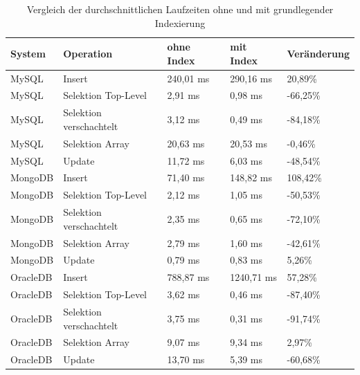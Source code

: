 \begin{table}[H]
\centering
\begin{tabular}{p{3cm}p{4cm}p{2.5cm}p{2.5cm}p{2.5cm}}
\hline
\textbf{System} & \textbf{Operation} & \textbf{ohne Index} & \textbf{mit Index} & \textbf{Veränderung} \\
\hline
MySQL & Insert & 240,01 ms & 290,16 ms & 20,89\% \\
MySQL & Selektion Top-Level & 2,91 ms & 0,98 ms & -66,25\% \\
MySQL & Selektion verschachtelt & 3,12 ms & 0,49 ms & -84,18\% \\
MySQL & Selektion Array & 20,63 ms & 20,53 ms & -0,46\% \\
MySQL & Update & 11,72 ms & 6,03 ms & -48,54\% \\
MongoDB & Insert & 71,40 ms & 148,82 ms & 108,42\% \\
MongoDB & Selektion Top-Level & 2,12 ms & 1,05 ms & -50,53\% \\
MongoDB & Selektion verschachtelt & 2,35 ms & 0,65 ms & -72,10\% \\
MongoDB & Selektion Array & 2,79 ms & 1,60 ms & -42,61\% \\
MongoDB & Update & 0,79 ms & 0,83 ms & 5,26\% \\
OracleDB & Insert & 788,87 ms & 1240,71 ms & 57,28\% \\
OracleDB & Selektion Top-Level & 3,62 ms & 0,46 ms & -87,40\% \\
OracleDB & Selektion verschachtelt & 3,75 ms & 0,31 ms & -91,74\% \\
OracleDB & Selektion Array & 9,07 ms & 9,34 ms & 2,97\% \\
OracleDB & Update & 13,70 ms & 5,39 ms & -60,68\% \\
\hline
\end{tabular}
\caption{Vergleich der durchschnittlichen Laufzeiten ohne und mit grundlegender Indexierung}
\label{tab:vergleich-indexierung-json}
\end{table}
